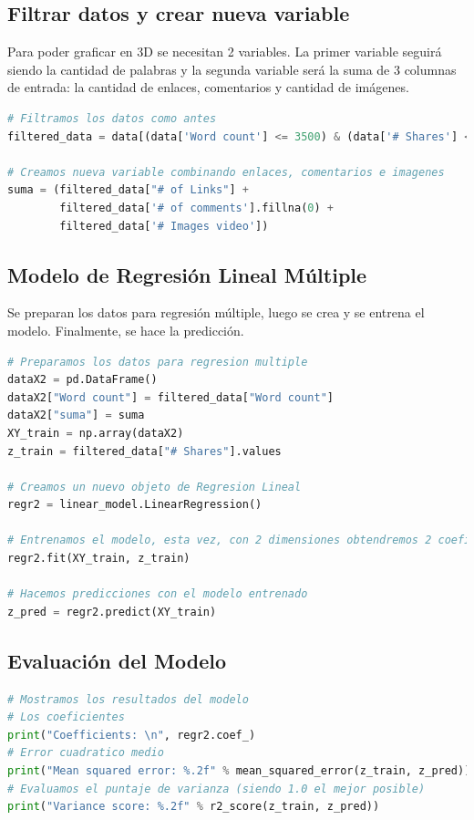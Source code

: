 \documentclass{article}
\begin{document}
\subsection{Filtrar datos y crear nueva variable}Para poder graficar en 3D se necesitan 2 variables. La primer variable seguirá siendo la cantidad de palabras y la segunda variable será la suma de 3 columnas de entrada: la cantidad de enlaces, comentarios y cantidad de imágenes.
\begin{lstlisting}[language=Python]
# Filtramos los datos como antes
filtered_data = data[(data['Word count'] <= 3500) & (data['# Shares'] <= 80000)]

# Creamos nueva variable combinando enlaces, comentarios e imagenes
suma = (filtered_data["# of Links"] + 
        filtered_data['# of comments'].fillna(0) + 
        filtered_data['# Images video'])
\end{lstlisting}

\subsection{Modelo de Regresión Lineal Múltiple}Se preparan los datos para regresión múltiple, luego se crea y se entrena el modelo. Finalmente, se hace la predicción.
\begin{lstlisting}[language=Python]
# Preparamos los datos para regresion multiple
dataX2 = pd.DataFrame()
dataX2["Word count"] = filtered_data["Word count"]
dataX2["suma"] = suma
XY_train = np.array(dataX2)  
z_train = filtered_data["# Shares"].values 

# Creamos un nuevo objeto de Regresion Lineal
regr2 = linear_model.LinearRegression()

# Entrenamos el modelo, esta vez, con 2 dimensiones obtendremos 2 coeficientes, para graficar un plano
regr2.fit(XY_train, z_train) 

# Hacemos predicciones con el modelo entrenado
z_pred = regr2.predict(XY_train)
\end{lstlisting}

\subsection{Evaluación del Modelo} 
\begin{lstlisting}[language=Python]
# Mostramos los resultados del modelo
# Los coeficientes
print("Coefficients: \n", regr2.coef_)
# Error cuadratico medio
print("Mean squared error: %.2f" % mean_squared_error(z_train, z_pred))
# Evaluamos el puntaje de varianza (siendo 1.0 el mejor posible)
print("Variance score: %.2f" % r2_score(z_train, z_pred))
\end{lstlisting}
\end{document}
